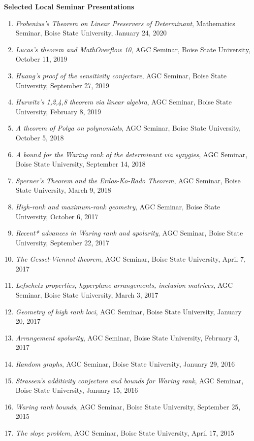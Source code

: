 \documentclass[12pt]{article}
\begin{document}
\textbf{Selected Local Seminar Presentations}
\begin{enumerate}[revarabic]
\item \textit{Frobenius's Theorem on Linear Preservers of Determinant},
Mathematics Seminar, Boise State University, January 24, 2020
\item \textit{Lucas’s theorem and MathOverflow 10},
AGC Seminar, Boise State University, October 11, 2019
\item \textit{Huang's proof of the sensitivity conjecture},
AGC Seminar, Boise State University, September 27, 2019
\item \textit{Hurwitz’s 1,2,4,8 theorem via linear algebra},
AGC Seminar, Boise State University, February 8, 2019
\item \textit{A theorem of Polya on polynomials},
AGC Seminar, Boise State University, October 5, 2018
\item \textit{A bound for the Waring rank of the determinant via syzygies},
AGC Seminar, Boise State University, September 14, 2018
\item \textit{Sperner’s Theorem and the Erdos-Ko-Rado Theorem},
AGC Seminar, Boise State University, March 9, 2018
\item \textit{High-rank and maximum-rank geometry},
AGC Seminar, Boise State University, October 6, 2017
\item \textit{Recent* advances in Waring rank and apolarity},
AGC Seminar, Boise State University, September 22, 2017
\item \textit{The Gessel-Viennot theorem},
AGC Seminar, Boise State University, April 7, 2017
\item \textit{Lefschetz properties, hyperplane arrangements, inclusion matrices},
AGC Seminar, Boise State University, March 3, 2017
\item \textit{Geometry of high rank loci},
AGC Seminar, Boise State University, January 20, 2017
\item \textit{Arrangement apolarity},
AGC Seminar, Boise State University, February 3, 2017
\item \textit{Random graphs},
AGC Seminar, Boise State University, January 29, 2016
\item \textit{Strassen's additivity conjecture and bounds for Waring rank},
AGC Seminar, Boise State University, January 15, 2016
\item \textit{Waring rank bounds},
AGC Seminar, Boise State University, September 25, 2015
\item \textit{The slope problem},
AGC Seminar, Boise State University, April 17, 2015

\end{enumerate}
\end{document}
